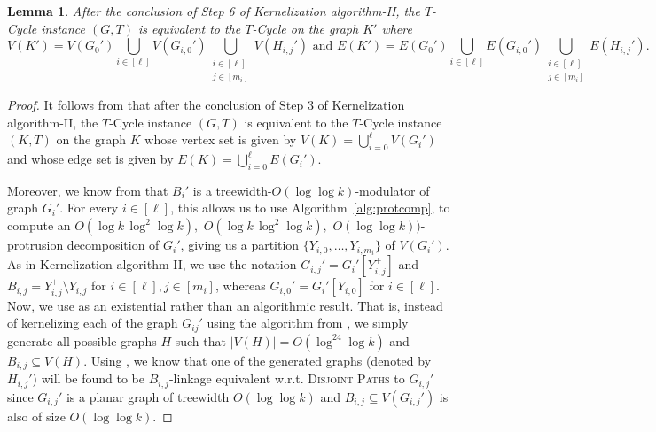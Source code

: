 \documentclass{article}
\newtheorem{lemma}[theorem]{Lemma}
\numberwithin{claimcounter}{lemma}
\newcommand{\dispaths}{\textsc{Disjoint Paths}\xspace}
\begin{document}
\begin{lemma} \label{lem:intercorrect}
       After the conclusion of Step 6 of {\sc Kernelization algorithm-II}, the {\sc $T$-Cycle} instance $(G,T)$ is equivalent to the {\sc $T$-Cycle} on the graph $K'$  where 
    \[ V(K') = V(G_0') \bigcup_{i\in [\ell]} V(G_{i,0}') \bigcup_{\substack{i\in [\ell] \\ j\in [m_i]}} V(H_{i,j}') \text{ and }  E(K') = E(G_0') \bigcup_{i\in [\ell]} E(G_{i,0}') \bigcup_{\substack{i\in [\ell] \\ j\in [m_i]}} E(H_{i,j}'). \] 
\end{lemma}
\begin{proof}
    It follows from  that after the conclusion of Step 3 of {\sc Kernelization algorithm-II}, the {\sc $T$-Cycle} instance $(G,T)$ is equivalent to the {\sc $T$-Cycle} instance $(K,T)$ on the graph $K$  whose vertex set is given by $V(K) = \bigcup_{i=0}^\ell V(G_i')$ and whose edge set is given by $E(K) = \bigcup_{i=0}^\ell E(G_i')$.

    Moreover, we know from   that $B_i'$ is a treewidth-$O(\log \log k)$-modulator  of graph $G_i'$.
    For every $i \in [\ell]$, this allows us to use Algorithm~\ref{alg:protcomp}, to compute an $O(\log k \, \log^2 \log k),$ $O(\log k \, \log^2 \log k),$ $ O(\log \log k))$-protrusion decomposition of $G_i'$, giving us a partition $\{Y_{i,0},\dots,Y_{i,m_i}\}$ of $V(G_i')$. As in {\sc Kernelization algorithm-II}, we use the notation $G_{i,j}' = G_i'[Y_{i,j}^+] $ and $B_{i,j} = Y_{i,j}^+ \setminus Y_{i,j}$ for $i\in[\ell], j \in [m_i]$, whereas $G_{i,0}' = G_i'[Y_{i,0}]$ for $i\in [\ell]$. Now, we use  as an existential rather than an algorithmic result. That is, instead of kernelizing each of the graph $G_{ij}'$ using the  algorithm from \cite{DBLP:conf/focs/0001Z23}, we simply generate all possible graphs $H$ such that $|V(H)| = O(\log^{24} \log k)$ and $B_{i,j} \subseteq V(H)$. Using , we know that one of the generated graphs (denoted by $H_{i,j}'$) will be found to be  $B_{i,j}$-linkage equivalent w.r.t. \dispaths to $G_{i,j}'$ since    $G_{i,j}'$ is a planar graph of treewidth $O(\log \log k)$ and $B_{i,j} \subseteq V(G_{i,j}')$ is also of size $O(\log \log k)$.


\end{proof}
\end{document}
